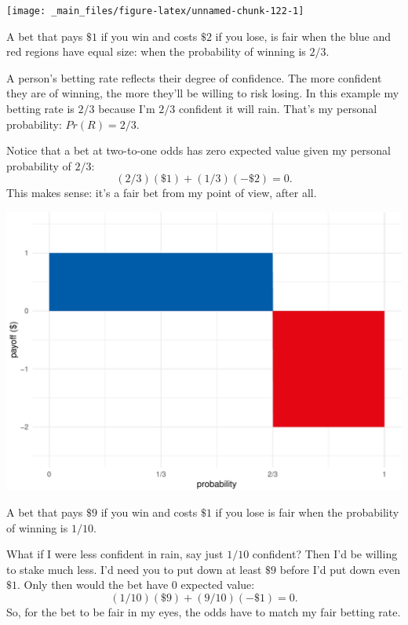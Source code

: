 \documentclass[justified]{tufte-book}
\newcommand{\p}{Pr}
\theoremstyle{definition}
\theoremstyle{definition}
\theoremstyle{definition}
\theoremstyle{remark}
\begin{document}
\begin{marginfigure}
\texttt{[image: \_main\_files/figure-latex/unnamed-chunk-122-1]} \caption[A bet that pays $\$1$ if you win and costs $\$2$ if you lose, is fair when the blue and red regions have equal size]{A bet that pays $\$1$ if you win and costs $\$2$ if you lose, is fair when the blue and red regions have equal size: when the probability of winning is $2/3$.}\label{fig:unnamed-chunk-122}
\end{marginfigure}

A person's betting rate reflects their degree of confidence. The more
confident they are of winning, the more they'll be willing to risk
losing. In this example my betting rate is \(2/3\) because I'm \(2/3\)
confident it will rain. That's my personal probability: \(\p(R) = 2/3\).

Notice that a bet at two-to-one odds has zero expected value given my
personal probability of \(2/3\): \[ (2/3)(\$1) + (1/3)(-\$2) = 0. \]
This makes sense: it's a fair bet from my point of view, after all.

\begin{marginfigure}
\includegraphics{_main_files/figure-latex/unnamed-chunk-123-1} \caption[A bet that pays $\$9$ if you win and costs $\$1$ if you lose is fair when the probability of winning is $1/10$]{A bet that pays $\$9$ if you win and costs $\$1$ if you lose is fair when the probability of winning is $1/10$.}\label{fig:unnamed-chunk-123}
\end{marginfigure}

What if I were less confident in rain, say just \(1/10\) confident? Then
I'd be willing to stake much less. I'd need you to put down at least
\(\$9\) before I'd put down even \(\$1\). Only then would the bet have
\(0\) expected value: \[ (1/10)(\$9) + (9/10)(-\$1) = 0. \] So, for the
bet to be fair in my eyes, the odds have to match my fair betting rate.
\end{document}
